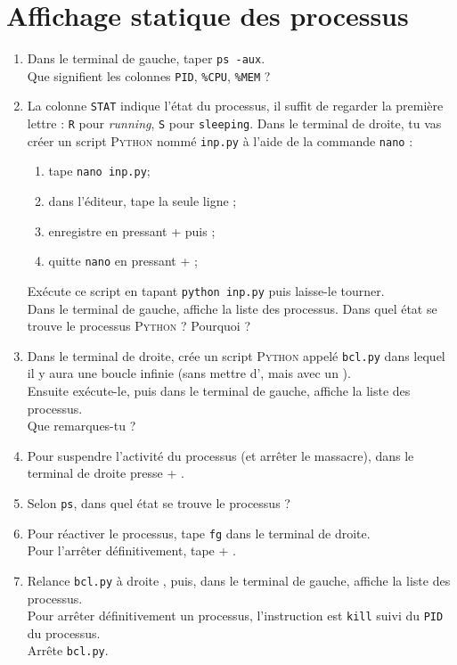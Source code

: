 \documentclass[a4paper,12pt,french]{book}
\begin{document}
\section*{Affichage statique des processus}
\begin{enumerate}[\bfseries 1.]
    \item Dans le terminal de gauche, taper \texttt{ps -aux}.\\
    Que signifient les colonnes \texttt{PID}, \texttt{\%CPU}, \texttt{\%MEM} ?
    \item La colonne \texttt{STAT} indique l'état du processus, il suffit de regarder la première lettre : \texttt{R} pour \textit{running}, \texttt{S} pour \texttt{sleeping}.
        Dans le terminal de droite, tu vas créer un script \textsc{Python} nommé \texttt{inp.py} à l'aide de la commande \texttt{nano} :
        \begin{enumerate}[--]
        	\item tape \texttt{nano inp.py};
            \item dans l'éditeur, tape la seule ligne ;
            \item enregistre en pressant  +  puis ;
            \item quitte \texttt{nano} en pressant  + ;
        \end{enumerate}
        Exécute ce script en tapant \texttt{python inp.py} puis laisse-le tourner.\\
        Dans le terminal de gauche, affiche la liste des processus. Dans quel état se trouve le processus \textsc{Python} ? Pourquoi ?
    \item Dans le terminal de droite, crée un script \textsc{Python} appelé \texttt{bcl.py} dans lequel il y aura une boucle infinie (sans mettre d', mais avec un ).\\
        Ensuite exécute-le, puis dans le terminal de gauche, affiche la liste des processus.\\
        Que remarques-tu ?
    \item Pour suspendre l'activité du processus (et arrêter le massacre), dans le terminal de droite presse  + .
    \item Selon \texttt{ps}, dans quel état se trouve le processus ?
    \item Pour réactiver le processus, tape \texttt{fg} dans le terminal de droite.\\
            Pour l'arrêter définitivement, tape  + .
    \item Relance \texttt{bcl.py} à droite , puis, dans le terminal de gauche, affiche la liste des processus.\\
          Pour arrêter définitivement un processus, l'instruction est \texttt{kill} suivi du \texttt{PID} du processus.\\
          Arrête \texttt{bcl.py}.
\end{enumerate}
\end{document}
